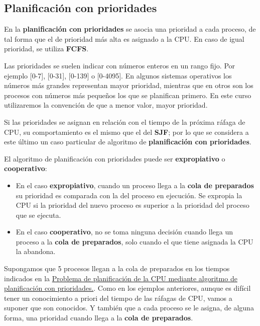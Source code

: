 \subsection{Planificación con
prioridades}\label{_planificaciuxf3n_con_prioridades}

{} En la \textbf{planificación con prioridades} se asocia una prioridad
a cada proceso, de tal forma que el de prioridad más alta es asignado a
la CPU. En caso de igual prioridad, se utiliza \textbf{FCFS}.

Las prioridades se suelen indicar con números enteros en un rango fijo.
Por ejemplo {[}0-7{]}, {[}0-31{]}, {[}0-139{]} o {[}0-4095{]}. En
algunos sistemas operativos los números más grandes representan mayor
prioridad, mientras que en otros son los procesos con números más
pequeños los que se planifican primero. En este curso utilizaremos la
convención de que a menor valor, mayor prioridad.

Si las prioridades se asignan en relación con el tiempo de la próxima
ráfaga de CPU, su comportamiento es el mismo que el del \textbf{SJF};
por lo que se considera a este último un caso particular de algoritmo de
\textbf{planificación con prioridades}.

El algoritmo de planificación con prioridades puede ser
\textbf{expropiativo} o \textbf{cooperativo}:

\begin{itemize}
\item
  En el caso \textbf{expropiativo}, cuando un proceso llega a la
  \textbf{cola de preparados} su prioridad es comparada con la del
  proceso en ejecución. Se expropia la CPU si la prioridad del nuevo
  proceso es superior a la prioridad del proceso que se ejecuta.
\item
  En el caso \textbf{cooperativo}, no se toma ninguna decisión cuando
  llega un proceso a la \textbf{cola de preparados}, solo cuando el que
  tiene asignada la CPU la abandona.
\end{itemize}

Supongamos que 5 procesos llegan a la cola de preparados en los tiempos
indicados en la \hyperref[tabla-problema-prioridad]{Problema de
planificación de la CPU mediante algoritmo de planificación con
prioridades.}. Como en los ejemplos anteriores, aunque es difícil tener
un conocimiento a priori del tiempo de las ráfagas de CPU, vamos a
suponer que son conocidos. Y también que a cada proceso se le asigna, de
alguna forma, una prioridad cuando llega a la \textbf{cola de
preparados}.

